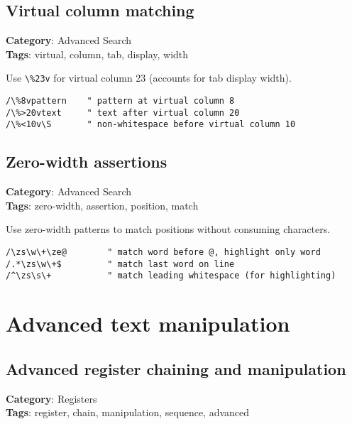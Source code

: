 \section{Virtual column matching}

\textbf{Category}: Advanced Search\\ \textbf{Tags}: virtual, column, tab, display, width
\vspace{0.5cm}

Use {\footnotesize \Verb§\%23v§} for virtual column 23 (accounts for tab display width).

\begin{Exa*}{}
\begin{Verbatim}[fontsize=\footnotesize, breaklines, breakanywhere]
/\%8vpattern    " pattern at virtual column 8
/\%>20vtext     " text after virtual column 20
/\%<10v\S       " non-whitespace before virtual column 10
\end{Verbatim}
\end{Exa*}

\section{Zero-width assertions}

\textbf{Category}: Advanced Search\\ \textbf{Tags}: zero-width, assertion, position, match
\vspace{0.5cm}

Use zero-width patterns to match positions without consuming characters.

\begin{Exa*}{}
\begin{Verbatim}[fontsize=\footnotesize, breaklines, breakanywhere]
/\zs\w\+\ze@        " match word before @, highlight only word
/.*\zs\w\+$         " match last word on line
/^\zs\s\+           " match leading whitespace (for highlighting)
\end{Verbatim}
\end{Exa*}

\chapter{Advanced text manipulation}
\section{Advanced register chaining and manipulation}

\textbf{Category}: Registers\\ \textbf{Tags}: register, chain, manipulation, sequence, advanced
\vspace{0.5cm}


